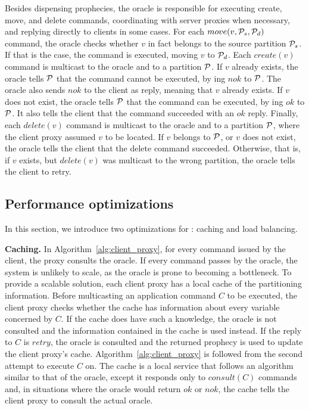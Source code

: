 Besides dispensing prophecies, the oracle is responsible for executing create, move, and delete commands, coordinating with server proxies when necessary, and replying directly to clients in some cases.
For each $move(v,\mathcal{P}_s,\mathcal{P}_d)$ command, the oracle checks whether $v$ in fact belongs to the source partition $\mathcal{P}_s$.
If that is the case, the command is executed, moving $v$ to $\mathcal{P}_d$.
Each $create(v)$ command is multicast to the oracle and to a partition $\mathcal{P}$.
If $v$ already exists, the oracle tells $\mathcal{P}$ that the command cannot be executed, by \rmcast{}ing $nok$ to $\mathcal{P}$.
The oracle also sends $nok$ to the client as reply, meaning that $v$ already exists.
If $v$ does not exist, the oracle tells $\mathcal{P}$ that the command can be executed, by \rmcast{}ing $ok$ to $\mathcal{P}$.
It also tells the client that the command succeeded with an $ok$ reply.
Finally, each $delete(v)$ command is multicast to the oracle and to a partition $\mathcal{P}$, where the client proxy assumed $v$ to be located.
If $v$ belongs to $\mathcal{P}$, or $v$ does not exist, the oracle tells the client that the delete command succeeded.
Otherwise, that is, if $v$ exists, but $delete(v)$ was multicast to the wrong partition, the oracle tells the client to retry.



\subsection{Performance optimizations}
\label{sec:optm}

In this section, we introduce two optimizations for \dssmr{}: caching and load balancing.

\textbf{Caching.} In Algorithm~\ref{alg:client_proxy}, for every command issued by the client, the proxy consults the oracle.
If every command passes by the oracle, the system is unlikely to scale, as the oracle is prone to becoming a bottleneck.
To provide a scalable solution, each client proxy has a local cache of the partitioning information.
Before multicasting an application command $C$ to be executed, the client proxy checks whether the cache has information about every variable concerned by $C$.
If the cache does have such a knowledge, the oracle is not consulted and the information contained in the cache is used instead.
If the reply to $C$ is $retry$, the oracle is consulted and the returned prophecy is used to update the client proxy's cache.
Algorithm~\ref{alg:client_proxy} is followed from the second attempt to execute $C$ on.
The cache is a local service that follows an algorithm similar to that of the oracle, except it responds only to $consult(C)$ commands and, in situations where the oracle would return $ok$ or $nok$, the cache tells the client proxy to consult the actual oracle.



